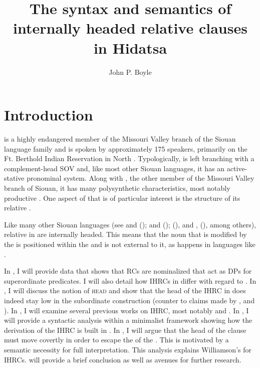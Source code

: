 \documentclass[output=paper]{LSP/langsci}
\author{John P. Boyle}
\title{The syntax and semantics of internally headed relative clauses in {Hidatsa}}
\begin{document}
\section{Introduction}  

 is a highly endangered member of the Missouri Valley branch of the Siouan language family and is spoken by approximately 175 speakers, primarily on the Ft. Berthold Indian Reservation in North . Typologically,  is left branching with a complement-head SOV  and, like most other Siouan languages, it has an active-stative pronominal system. Along with , the other member of the Missouri Valley branch of Siouan, it has many polysynthetic characteristics, most notably productive  \citep{Rankinetal2003, Boyle2007}. One aspect of  that is of particular interest is the structure of its relative .
	
Like many other Siouan languages (see \citealt{Drummond1976} and \citealt{Cumberland2005} (); \citealt{Williamson1987} and \citealt{RoodTaylor1996} (); \citealt{Quintero2004} (), and \citealt{Graczyk1991b}, \citeyear{Graczyk2007} (), among others), relative  in  are internally headed. This means that the noun that is modified by the  is positioned within the  and is not external to it, as happens in languages like .
	
In , I will provide data that shows that  RCs are nominalized  that act as DPs for superordinate predicates. I will also detail how IHRCs in  differ with regard to . In , I will discuss the notion of \textsc{head} and show that the head of the IHRC in  does indeed stay low in the subordinate construction (counter to claims made by \citet{Kayne1994}, \citet{Bianchi1999} and \citet{DiSciullo2005}). In , I will examine several previous works on IHRC, most notably \citet{Williamson1987} and \citet{Culy1990}. In , I will provide a syntactic analysis within a minimalist framework showing how the derivation of the IHRC is built in . In , I will argue that the head of the clause must move covertly in order to escape the  of the . This is motivated by a semantic necessity for full interpretation. This analysis explains Williamson's  for IHRCs.  will provide a brief conclusion as well as avenues for further research.
\end{document}
